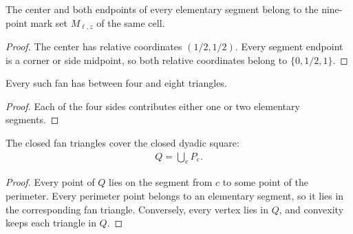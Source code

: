 \begin{lemma}
    \label{thm:area_law_cell_fan_mark_vertices}
    \leanok
    The center and both endpoints of every elementary segment belong
    to the nine-point mark set $M_{\ell,z}$ of the same cell.
\end{lemma}
\begin{proof}\leanok
    The center has relative coordinates $(1/2,1/2)$. Every segment
    endpoint is a corner or side midpoint, so both relative coordinates
    belong to $\{0,1/2,1\}$.
\end{proof}

\begin{lemma}
    \label{thm:area_law_cell_fan_count}
    \leanok
    Every such fan has between four and eight triangles.
\end{lemma}
\begin{proof}\leanok
    Each of the four sides contributes either one or two elementary
    segments.
\end{proof}

\begin{lemma}
    \label{thm:area_law_cell_fan_cover}
    \leanok
    The closed fan triangles cover the closed dyadic square:
    \begin{align}
        Q=\bigcup_e P_e.
    \end{align}
\end{lemma}
\begin{proof}\leanok
    Every point of $Q$ lies on the segment from $c$ to some point of the
    perimeter. Every perimeter point belongs to an elementary segment,
    so it lies in the corresponding fan triangle. Conversely, every
    vertex lies in $Q$, and convexity keeps each triangle in $Q$.
\end{proof}

